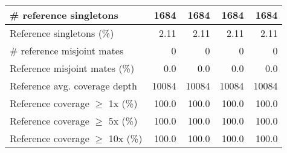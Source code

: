 \documentclass[12pt,a4paper]{article}
\begin{document}
\begin{table}[ht]
\begin{center}
\begin{tabular}{|l*{4}{|r}|}
\# reference singletons & 1684 & 1684 & 1684 & 1684 \\ \hline
Reference singletons (\%) & 2.11 & 2.11 & 2.11 & 2.11 \\ \hline
\# reference misjoint mates & 0 & 0 & 0 & 0 \\ \hline
Reference misjoint mates (\%) & 0.0 & 0.0 & 0.0 & 0.0 \\ \hline
Reference avg. coverage depth & 10084 & 10084 & 10084 & 10084 \\ \hline
Reference coverage $\geq$ 1x (\%) & 100.0 & 100.0 & 100.0 & 100.0 \\ \hline
Reference coverage $\geq$ 5x (\%) & 100.0 & 100.0 & 100.0 & 100.0 \\ \hline
Reference coverage $\geq$ 10x (\%) & 100.0 & 100.0 & 100.0 & 100.0 \\ \hline
\end{tabular}
\end{center}
\end{table}
\end{document}

